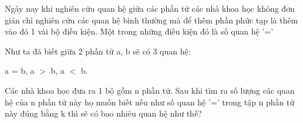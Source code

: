 Ngày nay khi nghiên cứu quan hệ giữa các phần tử các nhà khoa học không đơn giản chỉ nghiên cứu các quan hệ bình thường mà để thêm phần phức tạp là thêm vào đó 1 vài bộ điều kiện. Một trong những điều kiện đó là số quan hệ '='  

   Như ta đã biết giữa 2 phần tử a, b sẽ có 3 quan hệ:  

   a = b, a $>$ b, a $<$ b.  

   Các nhà khoa học đưa ra 1 bộ gồm n phần tử. Sau khi tìm ra số lượng các quan hệ của n phần tử này họ muốn biết nếu như số quan hệ '=' trong tập n phần tử này đúng bằng k thì sẽ có bao nhiêu quan hệ như thế?